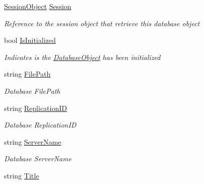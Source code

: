 \begin{DoxyCompactItemize}
\item 
\mbox{\hyperlink{class_session_object}{Session\+Object}} \mbox{\hyperlink{class_database_object_aa8484162b7d2a7c4c9426bca13c64c07}{Session}}
\begin{DoxyCompactList}\small\item\em Reference to the session object that retrieve this database object \end{DoxyCompactList}\item 
bool \mbox{\hyperlink{class_database_object_a5fe036d32a30eb10d1b3f6a30263f740}{Is\+Initialized}}
\begin{DoxyCompactList}\small\item\em Indicates is the \mbox{\hyperlink{class_database_object}{Database\+Object}} has been initialized \end{DoxyCompactList}\item 
string \mbox{\hyperlink{class_database_object_a38a1a78430c6cd1fc4eef054e39145ce}{File\+Path}}
\begin{DoxyCompactList}\small\item\em Database File\+Path \end{DoxyCompactList}\item 
string \mbox{\hyperlink{class_database_object_aaa091ee1a9a86d2d10fe2381ee2d1f4c}{Replication\+ID}}
\begin{DoxyCompactList}\small\item\em Database Replication\+ID \end{DoxyCompactList}\item 
string \mbox{\hyperlink{class_database_object_ad6bfcd30152f7a115ac5a1c7fbfa9fcb}{Server\+Name}}
\begin{DoxyCompactList}\small\item\em Database Server\+Name \end{DoxyCompactList}\item 
string \mbox{\hyperlink{class_database_object_a9af3f75274dd39f7fa82a355dc4ddf39}{Title}}

\end{DoxyCompactItemize}
